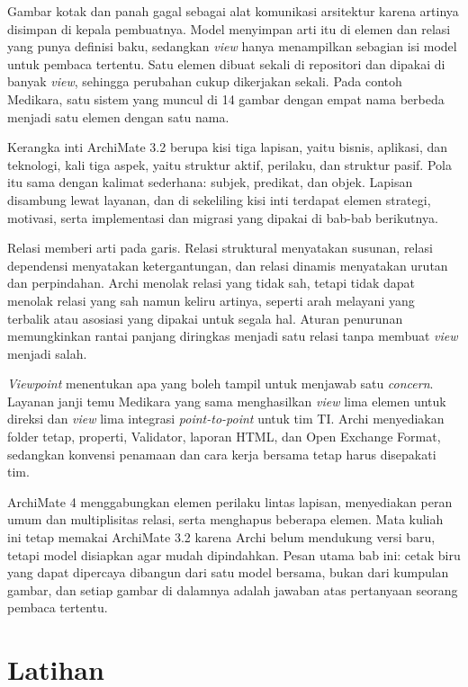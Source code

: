 Gambar kotak dan panah gagal sebagai alat komunikasi arsitektur karena
artinya disimpan di kepala pembuatnya. Model menyimpan arti itu di elemen dan
relasi yang punya definisi baku, sedangkan \textit{view} hanya menampilkan
sebagian isi model untuk pembaca tertentu. Satu elemen dibuat sekali di
repositori dan dipakai di banyak \textit{view}, sehingga perubahan cukup
dikerjakan sekali. Pada contoh Medikara, satu sistem yang muncul di 14
gambar dengan empat nama berbeda menjadi satu elemen dengan satu nama.

Kerangka inti ArchiMate 3.2 berupa kisi tiga lapisan, yaitu bisnis,
aplikasi, dan teknologi, kali tiga aspek, yaitu struktur aktif, perilaku, dan
struktur pasif. Pola itu sama dengan kalimat sederhana: subjek, predikat, dan
objek. Lapisan disambung lewat layanan, dan di sekeliling kisi inti terdapat
elemen strategi, motivasi, serta implementasi dan migrasi yang dipakai di
bab-bab berikutnya.

Relasi memberi arti pada garis. Relasi struktural menyatakan susunan, relasi
dependensi menyatakan ketergantungan, dan relasi dinamis menyatakan urutan dan
perpindahan. Archi menolak relasi yang tidak sah, tetapi tidak dapat menolak
relasi yang sah namun keliru artinya, seperti arah melayani yang terbalik atau
asosiasi yang dipakai untuk segala hal. Aturan penurunan memungkinkan rantai
panjang diringkas menjadi satu relasi tanpa membuat \textit{view} menjadi
salah.

\textit{Viewpoint} menentukan apa yang boleh tampil untuk menjawab satu
\textit{concern}. Layanan janji temu Medikara yang sama menghasilkan
\textit{view} lima elemen untuk direksi dan \textit{view} lima integrasi
\textit{point-to-point} untuk tim TI. Archi menyediakan folder tetap,
properti, Validator, laporan HTML, dan Open Exchange Format, sedangkan
konvensi penamaan dan cara kerja bersama tetap harus disepakati tim.

ArchiMate 4 menggabungkan elemen perilaku lintas lapisan, menyediakan peran
umum dan multiplisitas relasi, serta menghapus beberapa elemen. Mata kuliah
ini tetap memakai ArchiMate 3.2 karena Archi belum mendukung versi baru,
tetapi model disiapkan agar mudah dipindahkan. Pesan utama bab ini: cetak biru
yang dapat dipercaya dibangun dari satu model bersama, bukan dari kumpulan
gambar, dan setiap gambar di dalamnya adalah jawaban atas pertanyaan seorang
pembaca tertentu.

\section{Latihan}

